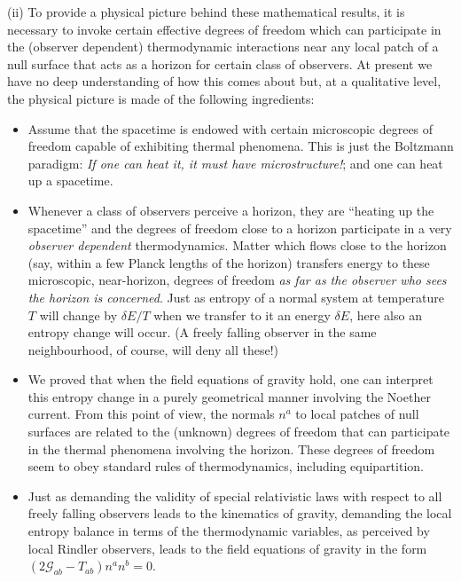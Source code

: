 \documentclass[12pt]{iopart}
\begin{document}
 
(ii) To provide a physical picture behind these mathematical results, it is necessary to invoke certain effective degrees of freedom which can participate in the (observer dependent) thermodynamic interactions near any local patch of a null surface 
that acts as a horizon for certain class of observers. At present we have no deep understanding of how this comes about but, at a qualitative level, the physical picture is made of the following  ingredients:
\begin{itemize}
\item
Assume that the spacetime is endowed with certain microscopic degrees of freedom capable of 
exhibiting thermal phenomena. This is just the Boltzmann paradigm: \textit{If one can heat it, it
must have microstructure!}; and one can heat up a spacetime. 
\item
Whenever a class of observers perceive a horizon, they are ``heating up the spacetime''
and the  degrees of freedom close to a horizon  participate  
in a very \textit{observer dependent} thermodynamics. 
Matter which flows close to the horizon
(say, within a few Planck lengths of the horizon) transfers energy to these microscopic, near-horizon, degrees of freedom \textit{as far as the observer who sees the horizon is concerned}. Just as  entropy of a normal system at temperature $T$ 
will change by $\delta E/T$ when we transfer to it an energy $\delta E$, here also an entropy change will occur. (A freely falling observer in the same neighbourhood, of course, will deny all these!)
\item
We proved that when the field equations of gravity hold, one can interpret this entropy change in  a purely geometrical manner involving the Noether current.
From this point of view, the  normals $n^a$ to local patches of null surfaces are related to the (unknown) degrees of freedom that can participate in the thermal phenomena involving the horizon. These degrees of freedom seem to obey standard rules of thermodynamics, including equipartition.
\item
Just as demanding the validity of special relativistic laws with respect to all freely falling observers leads to the kinematics of gravity, demanding the local entropy balance in terms of the thermodynamic variables, as perceived by local Rindler observers, leads to the field equations of gravity in the form $(2\mathcal{G}_{ab}-T_{ab})n^an^b=0$. 
 
\end{itemize}
\end{document}
